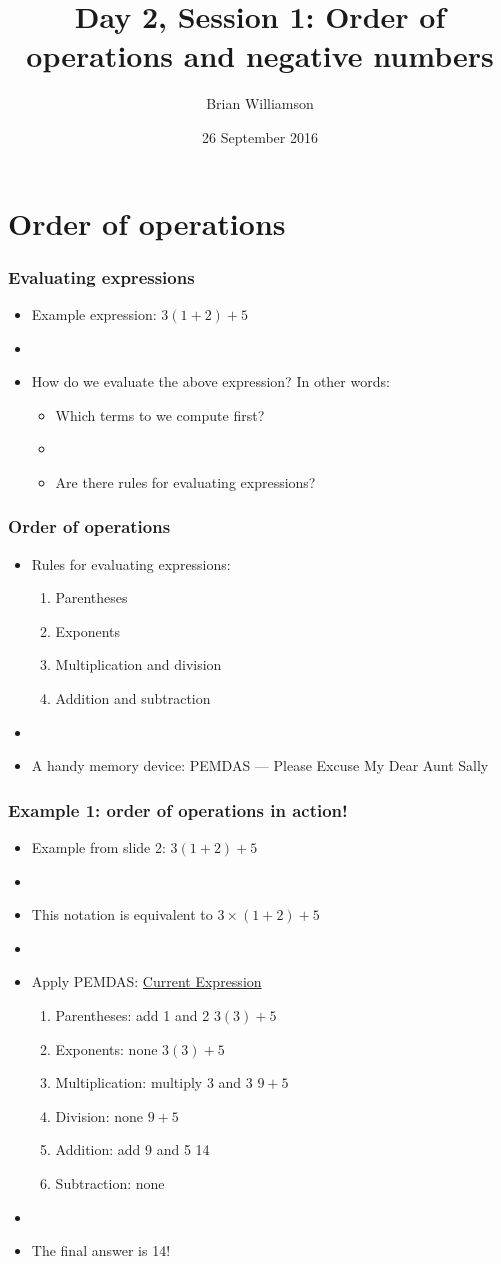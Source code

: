 \documentclass[12pt]{beamer}
\title{Day 2, Session 1: Order of operations and negative numbers}
\author{Brian Williamson}
\institute{EPI/BIOST Bootcamp 2016}
\date{26 September 2016}
\newcommand{\myframe}[1]{\begin{frame} \frametitle{#1}}
\begin{document}
\begin{frame}
\titlepage
\end{frame}

\section{Order of operations}
\myframe{Evaluating expressions}
\begin{itemize}
\item Example expression: $3(1 + 2) + 5$
\item[]
\item How do we evaluate the above expression? In other words:
\begin{itemize}
\item Which terms to we compute first?
\item[]
\item Are there rules for evaluating expressions?
\end{itemize}
\end{itemize}
\end{frame}

\myframe{Order of operations}
\begin{itemize}
\item Rules for evaluating expressions:
\begin{enumerate}
\item Parentheses
\item Exponents
\item Multiplication and division
\item Addition and subtraction
\end{enumerate}
\item[]
\item A handy memory device: PEMDAS --- Please Excuse My Dear Aunt Sally
\end{itemize}
\end{frame}

\myframe{Example 1: order of operations in action!}
\begin{itemize}
\item Example from slide 2: $3(1 + 2) + 5$
\item[]
\item This notation is equivalent to $3\times (1+2) + 5$
\item[]
\item Apply PEMDAS: \hfill \underline{Current Expression}
\begin{enumerate}
\item Parentheses: add 1 and 2 \hfill $3(3) + 5$
\item Exponents: none \hfill $3(3) + 5$
\item Multiplication: multiply 3 and 3 \hfill $9 + 5$
\item Division: none \hfill $9 + 5$
\item Addition: add 9 and 5 \hfill 14
\item Subtraction: none
\end{enumerate}
\item[]
\item The final answer is 14!
\end{itemize}
\end{frame}
\end{document}
